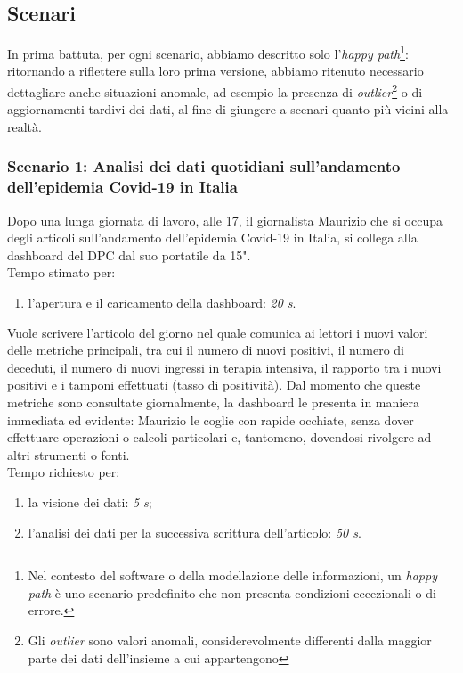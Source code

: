 \subsection{Scenari}
In prima battuta, per ogni scenario, abbiamo descritto solo l'\textit{happy path}\footnote{Nel contesto del software o della modellazione delle informazioni, un \textit{happy path} è uno scenario predefinito che non presenta condizioni eccezionali o di errore.}: ritornando a riflettere sulla loro prima versione, abbiamo ritenuto necessario dettagliare anche situazioni anomale, ad esempio la presenza di \textit{outlier}\footnote{Gli \textit{outlier} sono valori anomali, considerevolmente differenti dalla maggior parte dei dati dell'insieme a cui appartengono} o di aggiornamenti tardivi dei dati, al fine di giungere a scenari quanto più vicini alla realtà.

\subsubsection{Scenario 1: Analisi dei dati quotidiani sull'andamento dell'epidemia Covid-19 in Italia}
Dopo una lunga giornata di lavoro, alle 17, il giornalista Maurizio che si occupa degli articoli sull'andamento dell'epidemia Covid-19 in Italia, si collega alla dashboard del DPC dal suo portatile da 15".\\
Tempo stimato per:
\begin{enumerate}
    \item l'apertura e il caricamento della dashboard: \textit{20 s}.
\end{enumerate}\noindent

Vuole scrivere l'articolo del giorno nel quale comunica ai lettori i nuovi valori delle metriche principali, tra cui il numero di nuovi positivi, il numero di deceduti, il numero di nuovi ingressi in terapia intensiva, il rapporto tra i nuovi positivi e i tamponi effettuati (tasso di positività). Dal momento che queste metriche sono consultate giornalmente, la dashboard le presenta in maniera immediata ed evidente: Maurizio le coglie con rapide occhiate, senza dover effettuare operazioni o calcoli particolari e, tantomeno, dovendosi rivolgere ad altri strumenti o fonti.\\
Tempo richiesto per:
\begin{enumerate}
    \item la visione dei dati: \textit{5 s};
    \item l'analisi dei dati per la successiva scrittura dell'articolo: \textit{50 s}.
\end{enumerate}\noindent

